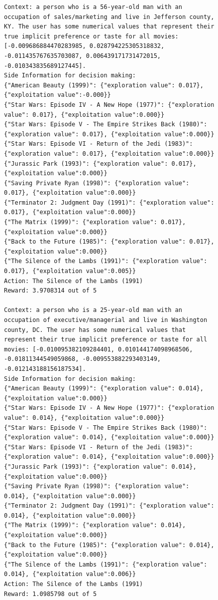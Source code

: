 \begin{figure}[ht]
    \centering
    \begin{lstlisting}[escapechar=!]
Context: a person who is a 56-year-old man with an occupation of sales/marketing and live in Jefferson county, KY. The user has some numerical values that represent their true implicit preference or taste for all movies: [-0.009686884470283985, 0.028794225305318832, -0.011435767635703087, 0.006439171731472015, -0.010343835689127445].
Side Information for decision making:
{"American Beauty (1999)": {"exploration value": 0.017}, {"exploitation value":-0.000}}
{"Star Wars: Episode IV - A New Hope (1977)": {"exploration value": 0.017}, {"exploitation value":0.000}}
{"Star Wars: Episode V - The Empire Strikes Back (1980)": {"exploration value": 0.017}, {"exploitation value":0.000}}
{"Star Wars: Episode VI - Return of the Jedi (1983)": {"exploration value": 0.017}, {"exploitation value":0.000}}
{"Jurassic Park (1993)": {"exploration value": 0.017}, {"exploitation value":0.000}}
{"Saving Private Ryan (1998)": {"exploration value": 0.017}, {"exploitation value":0.000}}
{"Terminator 2: Judgment Day (1991)": {"exploration value": 0.017}, {"exploitation value":0.000}}
{"The Matrix (1999)": {"exploration value": 0.017}, {"exploitation value":0.000}}
{"Back to the Future (1985)": {"exploration value": 0.017}, {"exploitation value":0.000}}
{"The Silence of the Lambs (1991)": {"exploration value": 0.017}, {"exploitation value":0.005}}
Action: The Silence of the Lambs (1991)
Reward: 3.9708314 out of 5

Context: a person who is a 25-year-old man with an occupation of executive/managerial and live in Washington county, DC. The user has some numerical values that represent their true implicit preference or taste for all movies: [-0.010095382109284401, 0.010144174098968506, -0.01811344549059868, -0.009553882293403149, -0.012143188156187534].
Side Information for decision making:
{"American Beauty (1999)": {"exploration value": 0.014}, {"exploitation value":0.000}}
{"Star Wars: Episode IV - A New Hope (1977)": {"exploration value": 0.014}, {"exploitation value":0.000}}
{"Star Wars: Episode V - The Empire Strikes Back (1980)": {"exploration value": 0.014}, {"exploitation value":0.000}}
{"Star Wars: Episode VI - Return of the Jedi (1983)": {"exploration value": 0.014}, {"exploitation value":0.000}}
{"Jurassic Park (1993)": {"exploration value": 0.014}, {"exploitation value":0.000}}
{"Saving Private Ryan (1998)": {"exploration value": 0.014}, {"exploitation value":0.000}}
{"Terminator 2: Judgment Day (1991)": {"exploration value": 0.014}, {"exploitation value":0.000}}
{"The Matrix (1999)": {"exploration value": 0.014}, {"exploitation value":0.000}}
{"Back to the Future (1985)": {"exploration value": 0.014}, {"exploitation value":0.000}}
{"The Silence of the Lambs (1991)": {"exploration value": 0.014}, {"exploitation value":0.006}}
Action: The Silence of the Lambs (1991)
Reward: 1.0985798 out of 5



\end{lstlisting}
\end{figure}
